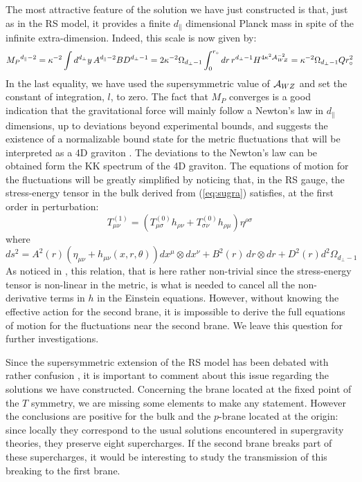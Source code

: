 \documentclass[a4paper,12pt]{article}
\def\MPlanck{{M_P}}
\def\dpar{d_{\scriptscriptstyle\parallel}}
\def\dperp{d_{\scriptscriptstyle\perp}}
\begin{document}
The most attractive feature of the solution we have just constructed is that, just
as in the RS model, it provides a finite $\dpar$ dimensional Planck mass in spite
of the infinite extra-dimension. Indeed, this scale is now given by:
%
\begin{equation}
\MPlanck^{\dpar-2}=
\kappa^{-2} \int d^{\dperp} y \, A^{\dpar-2} B D^{\dperp-1}
= 2 \kappa^{-2} \Omega_{\dperp-1} \int_{0}^{r_\circ}
dr \, r^{\dperp-1} H^{4\kappa^2 {\cal A}_{WZ}^{-2}}
=  \kappa^{-2} \Omega_{\dperp-1} Q r_\circ^2
\end{equation}
%
In the last equality, we have used the supersymmetric value of
${\cal A}_{WZ}$ and set the constant of integration, $l$, to zero.
The fact that $\MPlanck$ converges is a good indication that the gravitational
force will mainly follow a Newton's law in $\dpar$ dimensions, up to deviations
beyond experimental bounds, and suggests the existence of a normalizable bound state
for the metric fluctuations that will be interpreted as a 4D graviton
\cite{CsakiGraviton,FluctGraviton}.
The deviations to the Newton's law can be obtained form the KK spectrum
of the 4D graviton. The equations of motion for the fluctuations will be
greatly simplified by noticing that, in the RS gauge, the stress-energy tensor in
the bulk derived from (\ref{eq:sugra}) satisfies, at the first order in perturbation:
%
\begin{equation}
T_{\mu\nu}^{(1)} =
\left( T_{\mu\sigma}^{(0)}h_{\rho\nu} + T_{\sigma\nu}^{(0)}h_{\rho\mu} \right)
\eta^{\rho\sigma}
\end{equation}
%
where
%
\begin{equation}
ds^2 = A^2 (r) (\eta_{\mu\nu}+h_{\mu\nu}(x,r,\theta)) dx^\mu \otimes dx^\nu
+ B^2 (r) \, dr \otimes dr
+ D^2 (r) d^2 \Omega_{\dperp-1}
\end{equation}
%
As noticed in \cite{CsakiGraviton}, this relation, that is here rather non-trivial since the stress-energy tensor
is non-linear in the metric, is what is needed to cancel all the non-derivative terms
in $h$ in the Einstein equations.
However, without knowing the effective action for the second brane, it is impossible
to derive the full equations of motion for the fluctuations near the second brane.
We leave this question for further investigations.

Since the supersymmetric extension of the RS model has been debated with
rather confusion \cite{CGS3,RSsusy}, it is important to comment about this issue regarding
the solutions we have constructed. Concerning the brane located at the fixed point
of the $T$ symmetry, we are missing some elements to make any statement. However
the conclusions are positive for the bulk and the $p$-brane
located at the origin: since locally they correspond to the usual solutions
encountered in supergravity theories, they preserve eight supercharges. If the
second brane breaks part of these supercharges, it would be interesting
to study the transmission of this breaking to the first brane.
\end{document}
